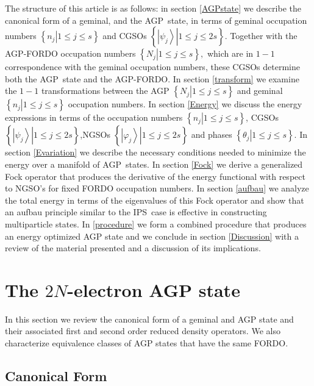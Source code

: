 \documentclass[aps,preprint]{revtex4}%
\begin{document}
The structure of this article is as follows: in section \ref{AGPstate} we
describe the canonical form of a geminal, and the AGP\ state, in terms of
geminal occupation numbers $\left\{  \left.  n_{j}\right\vert 1\leq j\leq
s\right\}  $ and CGSOs $\left\{  \left.  \left\vert \psi_{j}\right\rangle
\right\vert 1\leq j\leq2s\right\}  .$ Together with the AGP-FORDO occupation
numbers $\left\{  \left.  N_{j}\right\vert 1\leq j\leq s\right\}  ,$ which are
in $1-1$ correspondence with the geminal occupation numbers, these CGSOs
determine both the AGP\ state and the AGP-FORDO. In section \ref{transform} we
examine the $1-1$ transformations between the AGP $\left\{  \left.
N_{j}\right\vert 1\leq j\leq s\right\}  $ and geminal $\left\{  \left.
n_{j}\right\vert 1\leq j\leq s\right\}  $ occupation numbers. In section
\ref{Energy} we discuss the energy expressions in terms of the occupation
numbers $\left\{  \left.  n_{j}\right\vert 1\leq j\leq s\right\}  $, CGSOs
$\left\{  \left.  \left\vert \psi_{j}\right\rangle \right\vert 1\leq
j\leq2s\right\}  $,NGSOs $\left\{  \left.  \left\vert \varphi_{j}\right\rangle
\right\vert 1\leq j\leq2s\right\}  $ and phases $\left\{  \left.  \theta
_{j}\right\vert 1\leq j\leq s\right\}  .$ In section \ref{Evariation} we
describe the necessary conditions needed to minimize the energy over a
manifold of AGP\ states. In section \ref{Fock} we derive a generalized Fock
operator that produces the derivative of the energy functional with respect to
NGSO's for fixed FORDO occupation numbers. In section \ref{aufbau} we analyze
the total energy in terms of the eigenvalues of this Fock operator and show
that an aufbau principle similar to the IPS\ case is effective in constructing
multiparticle states. In \ref{procedure} we form a combined procedure that
produces an energy optimized AGP state and we conclude in section
\ref{Discussion} with a review of the material presented and a discussion of
its implications.

\section{The $2N$-electron AGP state\label{AGPstate}}

In this section we review the canonical form of a geminal and AGP state and
their associated first and second order reduced density operators. We also
characterize equivalence classes of AGP states that have the same FORDO.

\subsection{Canonical Form}
\end{document}
